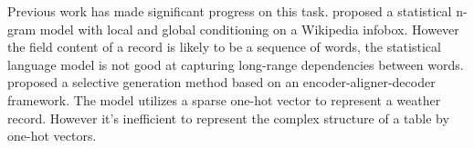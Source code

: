 \documentclass[letterpaper]{article} %
\begin{document}
Previous work has made significant progress on this task.
\citeauthor{lebret2016neural}  proposed a statistical n-gram model with local and global conditioning on a Wikipedia infobox. 
However the field content of a record is likely to be a sequence of words, the statistical language model is not good at capturing long-range dependencies between words.  
\citeauthor{mei2015talk} 
proposed a selective generation method based on an encoder-aligner-decoder framework. 
The model utilizes a sparse one-hot vector to represent a weather record.
However it's inefficient to represent the complex structure of a table by one-hot vectors.
\end{document}
